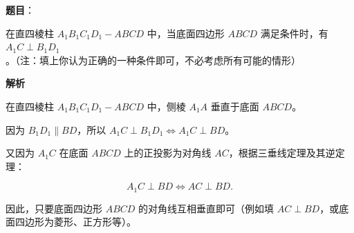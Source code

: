 \begin{answer}

\textbf{题目}：

在直四棱柱 $A_1B_1C_1D_1-ABCD$ 中，当底面四边形 $ABCD$ 满足条件\gkblank{}时，有 $A_1C\perp B_1D_1$。（注：填上你认为正确的一种条件即可，不必考虑所有可能的情形）

\textbf{解析}

在直四棱柱 $A_1B_1C_1D_1-ABCD$ 中，侧棱 $A_1A$ 垂直于底面 $ABCD$。

因为 $B_1D_1 \parallel BD$，所以 $A_1C \perp B_1D_1 \iff A_1C \perp BD$。

又因为 $A_1C$ 在底面 $ABCD$ 上的正投影为对角线 $AC$，根据三垂线定理及其逆定理：

\nopagebreak[4]
\[
A_1C \perp BD \iff AC \perp BD.
\]

因此，只要底面四边形 $ABCD$ 的对角线互相垂直即可（例如填 $AC\perp BD$，或底面四边形为菱形、正方形等）。


\end{answer}
